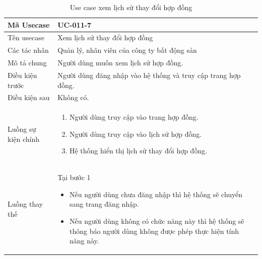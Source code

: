 \documentclass[12pt,a4paper]{article}
\begin{document}
    \begin{table}[H]
        \centering
        \begin{tabular}{|p{3.5cm}|p{11.5cm}|c|}
            \hline
            Mã Usecase      & UC-011-7                                                      \\
            \hline
            Tên usecase     & Xem lịch sử thay đổi hợp đồng                                 \\
            \hline
            Các tác nhân    & Quản lý, nhân viên của công ty bất động sản                   \\
            \hline
            Mô tả chung     & Người dùng muốn xem lịch sử hợp đồng.                         \\
            \hline

            Điều kiện trước & Người dùng đăng nhập vào hệ thống và truy cập trang hợp đồng. \\
            \hline

            Điều kiện sau   & Không có.                                                     \\
            \hline

            Luồng sự kiện chính & \vspace{-.8cm}\begin{enumerate}
                                                    \item Người dùng truy cập vào trang hợp đồng.
                                                    \item Người dùng truy cập vào lịch sử hợp đồng.
                                                    \item Hệ thống hiển thị lịch sử thay đổi hợp đồng.
            \end{enumerate}
            \\
            \hline
            Luồng thay thế & Tại bước 1\newline
            \vspace{-.8cm}\begin{itemize}
                              \item Nếu người dùng chưa đăng nhập thì hệ thống sẽ chuyển sang trang đăng nhập.
                              \item Nếu người dùng không có chức năng này thì hệ thống sẽ thông báo người dùng không được phép thực hiện tính năng này.
            \end{itemize}
            \\ \hline
        \end{tabular}
        \caption{Use case xem lịch sử thay đổi hợp đồng}

    \end{table}
\end{document}
